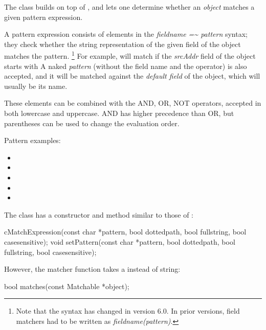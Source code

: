 The  class builds on top of ,
and lets one determine whether an \textit{object} matches a given pattern
expression.

A pattern expression consists of elements in the
\textit{fieldname ={\textasciitilde} pattern} syntax; they check whether the string
representation of the given field of the object matches the pattern.
\footnote{Note that the syntax has changed in {\opp} version 6.0. In prior
versions, field matchers had to be written as \textit{fieldname(pattern)}.}
For example,  will match if the \textit{srcAddr}
field of the object starts with  A naked \textit{pattern}
(without the field name and the \ttt{={\textasciitilde}} operator) is also accepted,
and it will be matched against the \textit{default field} of the object,
which will usually be its name.

These elements can be combined with the AND, OR, NOT operators, accepted in
both lowercase and uppercase. AND has higher precedence than OR, but
parentheses can be used to change the evaluation order.

Pattern examples:

\begin{itemize}
 \item {}
 \item {}
 \item {}
 \item {}
 \item {}
\end{itemize}

The  class has a constructor and 
method similar to those of :

\begin{cpp}
cMatchExpression(const char *pattern, bool dottedpath, bool fullstring,
                bool casesensitive);
void setPattern(const char *pattern, bool dottedpath, bool fullstring,
                bool casesensitive);
\end{cpp}

However, the matcher function takes a 
instead of string:

\begin{cpp}
bool matches(const Matchable *object);
\end{cpp}

